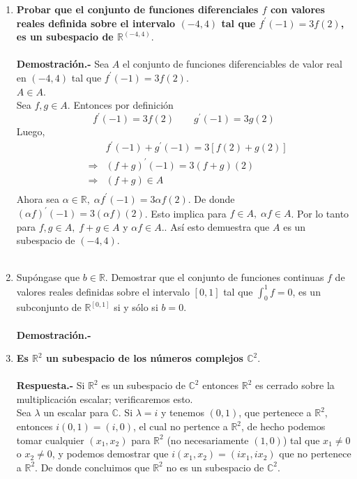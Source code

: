 \begin{multicols}{2}
\begin{enumerate}
\begin{enumerate}[\bfseries a)]
	\end{enumerate}

    \item \textbf{\boldmath Probar que el conjunto de funciones diferenciales $f$ con valores reales definida sobre el intervalo $(-4,4)$ tal que $f^{'}(-1)=3f(2)$, es un subespacio de $\mathbb{R}^{(-4,4)}$}.\\\\
	\textbf{Demostración.-}\; Sea $A$ el conjunto de funciones diferenciables de valor real en $(-4,4)$ tal que $f^{'}(-1)=3f(2)$.\\
	$A \in A$.\\
	Sea $f,g\in A$. Entonces por definición $$f^{'}(-1)=3f(2)\qquad g^{'}(-1)=3g(2)$$
	Luego,
	$$\begin{array}{rcl}
	    &&f^{'}(-1) + g^{'}(-1)=3[f(2)+g(2)]\\
	    &\Longrightarrow&(f+g)^{'}(-1)=3(f+g)(2)\\
	    &\Longrightarrow&(f+g)\in A\\
	\end{array}$$
	Ahora sea $\alpha \in \mathbb{R}, \; \alpha f^{'}(-1)=3\alpha f(2)$. De donde $(\alpha f)^{'}(-1)=3(\alpha f)(2)$. Esto implica para $f\in A, \; \alpha f \in A$. Por lo tanto para $f,g\in A,\; f+g\in A$ y $\alpha f \in A.$. Así esto demuestra que $A$ es un subespacio de $(-4,4)$.\\\\
	

    \item Supóngase que $b\in \mathbb{R}$. Demostrar que el conjunto de funciones continuas $f$ de valores reales definidas sobre el intervalo $[0,1]$ tal que $\int_0^1 f=0$, es un subconjunto de $\mathbb{R}^{[0,1]}$ si y sólo si $b=0$.\\\\
	\textbf{Demostración.-}\;

    \item \textbf{\boldmath Es $\mathbb{R}^2$ un subespacio de los números complejos $\mathbb{C}^2$}.\\\\
	\textbf{Respuesta.-}\; Si $\mathbb{R}^2$ es un subespacio de $\mathbb{C}^2$ entonces $\mathbb{R}^2$ es cerrado sobre la multiplicación escalar; verificaremos esto.\\
	Sea $\lambda$ un escalar para $\mathbb{C}$. Si $\lambda = i$  y  tenemos $(0,1)$, que pertenece a $\mathbb{R}^2$, entonces $i(0,1)=(i,0)$, el cual no pertence a $\mathbb{R}^2$, de hecho podemos tomar cualquier $(x_1,x_2)$ para $\mathbb{R}^2$ (no necesariamente $(1,0)$) tal que $x_1\neq 0$ o $x_2 \neq 0$, y podemos demostrar que $i(x_1,x_2)=(ix_1,ix_2)$ que no pertenece a $\mathbb{R}^2$. De donde concluimos que $\mathbb{R}^2$ no es un subespacio de $\mathbb{C}^2.$\\\\


\end{enumerate}
\end{multicols}
